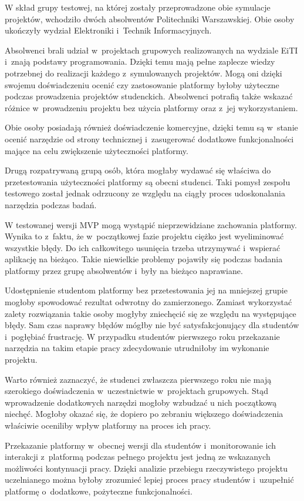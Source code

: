 W skład grupy testowej, na której zostały przeprowadzone obie symulacje projektów, wchodziło dwóch absolwentów Politechniki Warszawskiej.
Obie osoby ukończyły wydział Elektroniki i~Technik Informacyjnych.

Absolwenci brali udział w~projektach grupowych realizowanych na wydziale EiTI i~znają podstawy programowania.
Dzięki temu mają pełne zaplecze wiedzy potrzebnej do realizacji każdego z~symulowanych projektów.
Mogą oni dzięki swojemu doświadczeniu ocenić czy zastosowanie platformy byłoby użyteczne podczas prowadzenia projektów studenckich.
Absolwenci potrafią także wskazać różnice w~prowadzeniu projektu bez użycia platformy oraz z~jej wykorzystaniem.

Obie osoby posiadają również doświadczenie komercyjne, dzięki temu są w~stanie ocenić narzędzie od strony technicznej i~zasugerować dodatkowe funkcjonalności mające na celu zwiększenie użyteczności platformy.

Drugą rozpatrywaną grupą osób, która mogłaby wydawać się właściwa do przetestowania użyteczności platformy są obecni studenci.
Taki pomysł zespołu testowego został jednak odrzucony ze względu na ciągły proces udoskonalania narzędzia podczas badań.

W testowanej wersji MVP mogą wystąpić nieprzewidziane zachowania platformy.
Wynika to z~faktu, że w~początkowej fazie projektu ciężko jest wyeliminować wszystkie błędy.
Do ich całkowitego usunięcia trzeba utrzymywać i~wspierać aplikację na bieżąco.
Takie niewielkie problemy pojawiły się podczas badania platformy przez grupę absolwentów i~były na bieżąco naprawiane.

Udostępnienie studentom platformy bez przetestowania jej na mniejszej grupie mogłoby spowodować rezultat odwrotny do zamierzonego.
Zamiast wykorzystać zalety rozwiązania takie osoby mogłyby zniechęcić się ze względu na występujące błędy.
Sam czas naprawy błędów mógłby nie być satysfakcjonujący dla studentów i~pogłębiać frustrację.
W przypadku studentów pierwszego roku przekazanie narzędzia na takim etapie pracy zdecydowanie utrudniłoby im wykonanie projektu.

Warto również zaznaczyć, że studenci zwłaszcza pierwszego roku nie mają szerokiego doświadczenia w~uczestnictwie w~projektach grupowych.
Stąd wprowadzenie dodatkowych narzędzi mogłoby wzbudzać u nich początkową niechęć.
Mogłoby okazać się, że dopiero po zebraniu większego doświadczenia właściwie oceniliby wpływ platformy na proces ich pracy.

Przekazanie platformy w~obecnej wersji dla studentów i~monitorowanie ich interakcji z~platformą podczas pełnego projektu jest jedną ze wskazanych możliwości kontynuacji pracy.
Dzięki analizie przebiegu rzeczywistego projektu uczelnianego można byłoby zrozumieć lepiej proces pracy studentów i~uzupełnić platformę o~dodatkowe, pożyteczne funkcjonalności.


